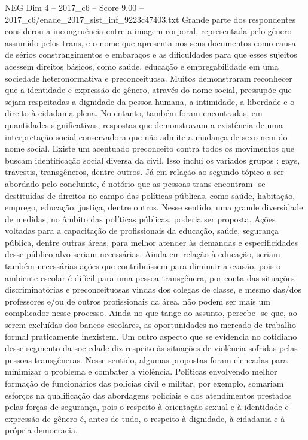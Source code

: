 \begin{textsample}{NEG Dim 4 – 2017\_c6 – Score 9.00 – 2017\_c6/enade\_2017\_sist\_inf\_9223c47403.txt}
Grande parte dos respondentes considerou a incongruência entre a imagem corporal, representada pelo gênero assumido pelos trans, e o nome que apresenta nos seus documentos como causa de sérios constrangimentos e embaraços e as dificuldades para que esses sujeitos acessem direitos básicos, como saúde, educação e empregabilidade em uma sociedade heteronormativa e preconceituosa.
Muitos demonstraram reconhecer que a identidade e expressão de gênero, através do nome social, pressupõe que sejam respeitadas a dignidade da pessoa humana, a intimidade, a liberdade e o direito à cidadania plena.
No entanto, também foram encontradas, em quantidades significativas, respostas que demonstravam a existência de uma interpretação social conservadora que não admite a mudança de sexo nem do nome social.
Existe um acentuado preconceito contra todos os movimentos que buscam identificação social diversa da civil.
Isso inclui os variados grupos : gays, travestis, transgêneros, dentre outros.
Já em relação ao segundo tópico a ser abordado pelo concluinte, é notório que as pessoas trans encontram -se destituídas de direitos no campo das políticas públicas, como saúde, habitação, emprego, educação, justiça, dentre outros.
Nesse sentido, uma grande diversidade de medidas, no âmbito das políticas públicas, poderia ser proposta.
Ações voltadas para a capacitação de profissionais da educação, saúde, segurança pública, dentre outras áreas, para melhor atender às demandas e especificidades desse público alvo seriam necessárias.
Ainda em relação à educação, seriam também necessárias ações que contribuíssem para diminuir a evasão, pois o ambiente escolar é difícil para uma pessoa transgênera, por conta das situações discriminatórias e preconceituosas vindas dos colegas de classe, e mesmo das/dos professores e/ou de outros profissionais da área, não podem ser mais um complicador nesse processo.
Ainda no que tange ao assunto, percebe -se que, ao serem excluídas dos bancos escolares, as oportunidades no mercado de trabalho formal praticamente inexistem.
Um outro aspecto que se evidencia no cotidiano desse segmento da sociedade diz respeito às situações de violência sofridas pelas pessoas transgêneras.
Nesse sentido, algumas propostas foram elencadas para minimizar o problema e combater a violência.
Políticas envolvendo melhor formação de funcionários das polícias civil e militar, por exemplo, somariam esforços na qualificação das abordagens policiais e dos atendimentos prestados pelas forças de segurança, pois o respeito à orientação sexual e à identidade e expressão de gênero é, antes de tudo, o respeito à dignidade, à cidadania e à própria democracia.

\end{textsample}
